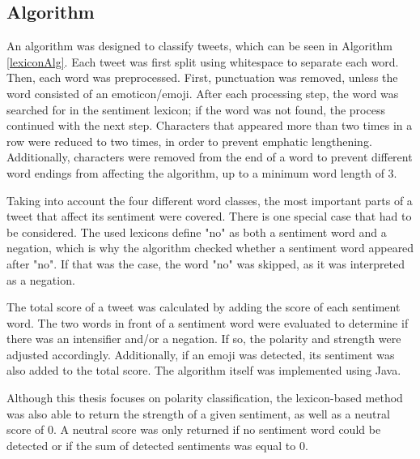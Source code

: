 \subsection{Algorithm}

An algorithm was designed to classify tweets, which can be seen in Algorithm \ref{lexiconAlg}. Each tweet was first split using whitespace to separate each word. Then, each word was preprocessed. First, punctuation was removed, unless the word consisted of an emoticon/emoji. After each processing step, the word was searched for in the sentiment lexicon; if the word was not found, the process continued with the next step. Characters that appeared more than two times in a row were reduced to two times, in order to prevent emphatic lengthening. Additionally, characters were removed from the end of a word to prevent different word endings from affecting the algorithm, up to a minimum word length of 3.

Taking into account the four different word classes, the most important parts of a tweet that affect its sentiment were covered. There is one special case that had to be considered. The used lexicons define "no" as both a sentiment word and a negation, which is why the algorithm checked whether a sentiment word appeared after "no". If that was the case, the word "no" was skipped, as it was interpreted as a negation.

The total score of a tweet was calculated by adding the score of each sentiment word. The two words in front of a sentiment word were evaluated to determine if there was an intensifier and/or a negation. If so, the polarity and strength were adjusted accordingly. Additionally, if an emoji was detected, its sentiment was also added to the total score. The algorithm itself was implemented using Java.

Although this thesis focuses on polarity classification, the lexicon-based method was also able to return the strength of a given sentiment, as well as a neutral score of 0. A neutral score was only returned if no sentiment word could be detected or if the sum of detected sentiments was equal to 0.

